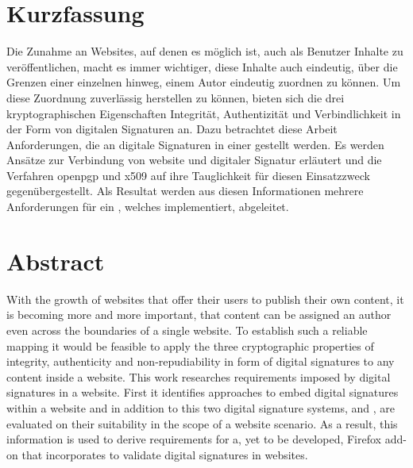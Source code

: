 

\noindent
\begin{minipage}{\textwidth}
\chapter*{Kurzfassung}
Die Zunahme an Websites, auf denen es möglich ist, auch als Benutzer Inhalte zu veröffentlichen, macht es immer wichtiger, diese Inhalte auch eindeutig, über
die Grenzen einer einzelnen  hinweg, einem Autor eindeutig zuordnen zu können. Um diese Zuordnung zuverlässig herstellen zu können, bieten
sich die drei kryptographischen Eigenschaften Integrität, Authentizität und Verbindlichkeit in der Form von digitalen Signaturen an. Dazu betrachtet diese
Arbeit Anforderungen, die an digitale Signaturen in einer  gestellt werden. Es werden Ansätze zur Verbindung von \gls{website} und digitaler
Signatur erläutert und die Verfahren \gls{openpgp} und \gls{x509} auf ihre Tauglichkeit für diesen Einsatzzweck gegenübergestellt. Als Resultat werden aus
diesen Informationen mehrere Anforderungen für ein , welches  implementiert, abgeleitet.

\chapter*{Abstract}
With the growth of websites that offer their users to publish their own content, it is becoming more and more important, that content can be assigned an
author even across the boundaries of a single website. To establish such a reliable mapping it would be feasible to apply the three cryptographic
properties of integrity, authenticity and non-repudiability in form of digital signatures to any content inside a website. This work researches requirements
imposed by digital signatures in a website. First it identifies approaches to embed digital signatures within a website and in addition to this two digital
signature systems,  and , are evaluated on their suitability in the scope of a website scenario. As a result, this information
is used to derive requirements for a, yet to be developed, Firefox add-on that incorporates  to validate digital signatures in websites.

\end{minipage}
